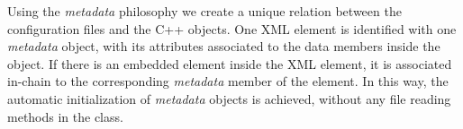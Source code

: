 Using the \emph{metadata} philosophy we create a unique relation between the configuration files and the C++ objects. One XML element is identified with one \emph{metadata} object, with its attributes associated to the data members inside the object. If there is an embedded element inside the XML element, it is associated in-chain to the corresponding \emph{metadata} member of the element. In this way, the automatic initialization of \emph{metadata} objects is achieved, without any file reading methods in the class.










